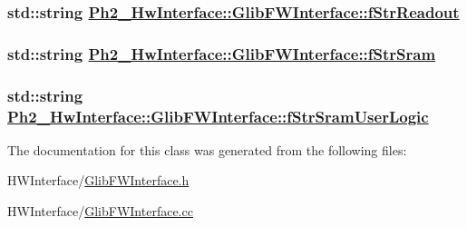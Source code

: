 \hypertarget{class_ph2___hw_interface_1_1_glib_f_w_interface_1c2f018359fc0fc7f9652d6058ac94f1}{
\subsubsection[fStrReadout]{\setlength{\rightskip}{0pt plus 5cm}std::string \hyperlink{class_ph2___hw_interface_1_1_glib_f_w_interface_1c2f018359fc0fc7f9652d6058ac94f1}{Ph2\_\-Hw\-Interface::Glib\-FWInterface::f\-Str\-Readout}}}
\label{class_ph2___hw_interface_1_1_glib_f_w_interface_1c2f018359fc0fc7f9652d6058ac94f1}


\hypertarget{class_ph2___hw_interface_1_1_glib_f_w_interface_3fd05ec282e3485d13f3d4271f622039}{
\subsubsection[fStrSram]{\setlength{\rightskip}{0pt plus 5cm}std::string \hyperlink{class_ph2___hw_interface_1_1_glib_f_w_interface_3fd05ec282e3485d13f3d4271f622039}{Ph2\_\-Hw\-Interface::Glib\-FWInterface::f\-Str\-Sram}}}
\label{class_ph2___hw_interface_1_1_glib_f_w_interface_3fd05ec282e3485d13f3d4271f622039}


\hypertarget{class_ph2___hw_interface_1_1_glib_f_w_interface_ee5e3a859a56e2ab7cead5100714851c}{
\subsubsection[fStrSramUserLogic]{\setlength{\rightskip}{0pt plus 5cm}std::string \hyperlink{class_ph2___hw_interface_1_1_glib_f_w_interface_ee5e3a859a56e2ab7cead5100714851c}{Ph2\_\-Hw\-Interface::Glib\-FWInterface::f\-Str\-Sram\-User\-Logic}}}
\label{class_ph2___hw_interface_1_1_glib_f_w_interface_ee5e3a859a56e2ab7cead5100714851c}




The documentation for this class was generated from the following files:\begin{CompactItemize}
\item 
HWInterface/\hyperlink{_glib_f_w_interface_8h}{Glib\-FWInterface.h}\item 
HWInterface/\hyperlink{_glib_f_w_interface_8cc}{Glib\-FWInterface.cc}\end{CompactItemize}
